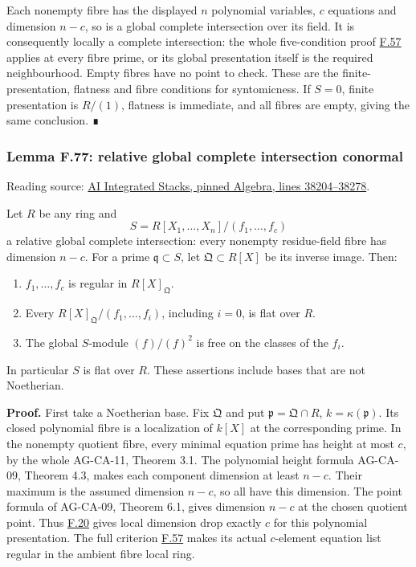 \documentclass[11pt,a4paper,openany]{report}
\newcounter{none}
\providecommand{\tightlist}{\setlength{\itemsep}{0pt}\setlength{\parskip}{0pt}}
\begin{document}
Each nonempty fibre has the displayed \(n\) polynomial variables, \(c\) equations and dimension \(n-c\), so is a global complete intersection over its field. It is consequently locally a complete intersection: the whole five-condition proof \hyperref[AG-RG-S05-algebra-lemma-lci]{F.57} applies at every fibre prime, or its global presentation itself is the required neighbourhood. Empty fibres have no point to check. These are the finite-presentation, flatness and fibre conditions for syntomicness. If \(S=0\), finite presentation is \(R/(1)\), flatness is immediate, and all fibres are empty, giving the same conclusion. ∎

\label{AG-RG-S05-algebra-lemma-relative-global-complete-intersection-conormal}

\subsubsection{Lemma F.77: relative global complete intersection conormal}\label{AG-RG-S05-lemma-f.77-relative-global-complete-intersection-conormal}

Reading source: \href{https://github.com/KokunoYumeto/unofficial-stacks-project-ai-drafts/blob/565b10e987aba5969b21145a0833f42d69f96790/algebra.tex\#L38204-L38278}{AI Integrated Stacks, pinned Algebra, lines 38204--38278}.

Let \(R\) be any ring and \[S=R[X_1,\ldots,X_n]/(f_1,\ldots,f_c)\] a relative global complete intersection: every nonempty residue-field fibre has dimension \(n-c\). For a prime \(\mathfrak q\subset S\), let \(\mathfrak Q\subset R[X]\) be its inverse image. Then:

\begin{enumerate}
\def\labelenumi{\arabic{enumi}.}
\tightlist
\item
  \(f_1,\ldots,f_c\) is regular in \(R[X]_{\mathfrak Q}\).
\item
  Every \(R[X]_{\mathfrak Q}/(f_1,\ldots,f_i)\), including \(i=0\), is flat over \(R\).
\item
  The global \(S\)-module \((f)/(f)^2\) is free on the classes of the \(f_i\).
\end{enumerate}

In particular \(S\) is flat over \(R\). These assertions include bases that are not Noetherian.

\textbf{Proof.} First take a Noetherian base. Fix \(\mathfrak Q\) and put \(\mathfrak p=\mathfrak Q\cap R\), \(k=\kappa(\mathfrak p)\). Its closed polynomial fibre is a localization of \(k[X]\) at the corresponding prime. In the nonempty quotient fibre, every minimal equation prime has height at most \(c\), by the whole AG-CA-11, Theorem 3.1. The polynomial height formula AG-CA-09, Theorem 4.3, makes each component dimension at least \(n-c\). Their maximum is the assumed dimension \(n-c\), so all have this dimension. The point formula of AG-CA-09, Theorem 6.1, gives dimension \(n-c\) at the chosen quotient point. Thus \hyperref[AG-RG-S05-algebra-lemma-codimension]{F.20} gives local dimension drop exactly \(c\) for this polynomial presentation. The full criterion \hyperref[AG-RG-S05-algebra-lemma-lci]{F.57} makes its actual \(c\)-element equation list regular in the ambient fibre local ring.
\end{document}
